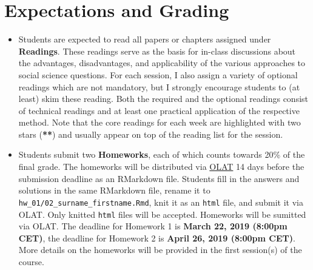 \documentclass[abstract=on,parskip=full,headings=standardclasses,fontsize=11pt,paper=a4]{scrartcl}
\begin{document}
\section*{Expectations and Grading}


\begin{itemize}
\item Students are expected to read all papers or chapters assigned under \textbf{Readings}. These readings serve as the basis for in-class discussions about the advantages, disadvantages, and applicability of the various approaches to social science questions. For each session, I also assign a variety of optional readings which are not mandatory, but I strongly encourage students to (at least) skim these reading. Both the required  and the optional readings consist of technical  readings and at least one practical application of the respective method. Note that the core readings for each week are highlighted with two stars (\textbf{**}) and usually appear on top of the reading list for the session.

\item Students submit two \textbf{Homeworks}, each of which counts towards  20\% of the final grade. The homeworks will be distributed via \href{https://lms.uzh.ch/url/RepositoryEntry/16539681118?guest=true&lang=en}{OLAT} 14 days before the submission deadline as an RMarkdown file. Students fill in the answers and solutions in the same RMarkdown file, rename it  to \texttt{hw\_01/02\_surname\_firstname.Rmd}, knit it as an \texttt{html} file, and submit it via OLAT. Only knitted \texttt{html} files will be accepted. Homeworks will be sumitted via OLAT. The deadline for Homework 1 is \textbf{March 22, 2019 (8:00pm CET)}, the deadline for Homework 2 is \textbf{April 26, 2019 (8:00pm CET)}. More details on the homeworks will be provided in the first session(s) of the course. 


\end{itemize}
\end{document}
